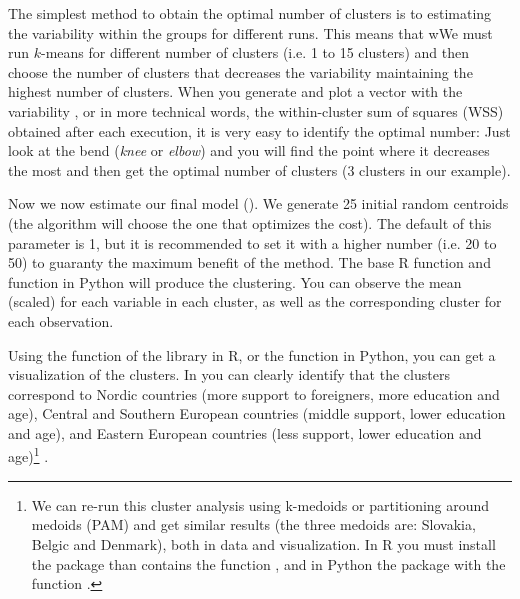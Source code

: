 The simplest method to obtain the optimal number of clusters is to
estimating the variability within the groups for different runs. This
means that wWe must run $k$-means for different number of clusters
(i.e. 1 to 15 clusters) and then choose the number of clusters that
decreases the variability maintaining the highest number of
clusters. When you generate and plot a vector with the variability ,
or in more technical words, the within-cluster sum of squares (WSS)
obtained after each execution, it is very easy to identify the optimal
number: Just look at the bend (\textit{knee} or \textit{elbow}) and
you will find the point where it decreases the most and then get the
optimal number of clusters (3 clusters in our example).


Now we now estimate our final model (). We generate 25
initial random centroids (the algorithm will choose the one that
optimizes the cost). The default of this parameter is 1, but it is
recommended to set it with a higher number (i.e. 20 to 50) to guaranty
the maximum benefit of the method. The base R function  and
 function  in Python will produce the
clustering. You can observe the mean (scaled) for each variable in
each cluster, as well as the corresponding cluster for each
observation.


Using the function  of the library  in R, or the  function  in Python, you can get a visualization of the clusters. In  you can clearly identify that the clusters correspond to Nordic countries (more support to foreigners, more education and age), Central and Southern European countries (middle support, lower education and age), and Eastern European countries (less support, lower education and age)\footnote{We can re-run this cluster analysis using k-medoids or partitioning around medoids (PAM) and get similar results (the three medoids are: Slovakia, Belgic and Denmark), both in data and visualization. In R you must install the package  than contains the function , and in Python the package  with the function .} .



